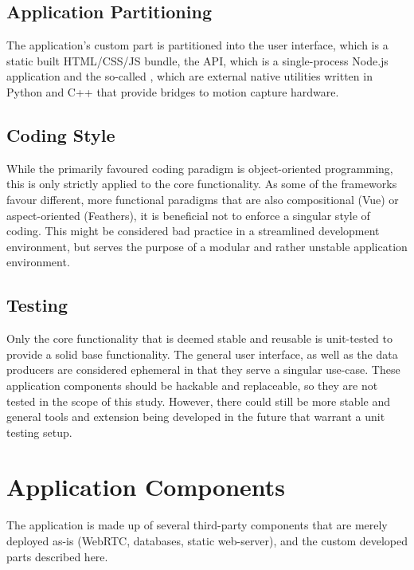 \subsection{Application Partitioning}

The application's custom part is partitioned into the user interface, which is a static built \ac{HTML}/\ac{CSS}/\ac{JS} bundle, the \ac{API}, which is a single-process Node.js application and the so-called , which are external native utilities written in Python and C++ that provide bridges to motion capture hardware.

\subsection{Coding Style}

While the primarily favoured coding paradigm is object-oriented programming, this is only strictly applied to the core functionality. As some of the frameworks favour different, more functional paradigms that are also compositional (Vue) or aspect-oriented (Feathers), it is beneficial not to enforce a singular style of coding. This might be considered bad practice in a streamlined development environment, but serves the purpose of a modular and rather unstable  application environment.

\subsection{Testing}

Only the core functionality that is deemed stable and reusable is unit-tested to provide a solid base functionality. The general user interface, as well as the data producers are considered ephemeral in that they serve a singular use-case. These application components should be hackable and replaceable, so they are not tested in the scope of this study. However, there could still be more stable and general tools and extension being developed in the future that warrant a unit testing setup.

\section{Application Components}

The application is made up of several third-party components that are merely deployed as-is (WebRTC, databases, static web-server), and the custom developed parts described here.

